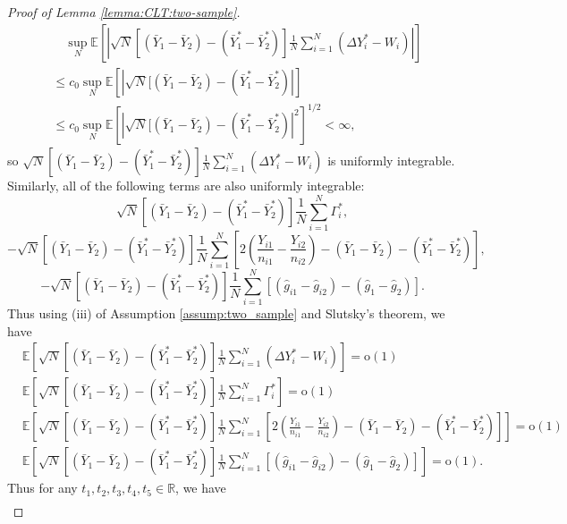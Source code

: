 \documentclass[12pt,letterpaper]{article}
\begin{document}
\begin{proof}[Proof of Lemma \ref{lemma:CLT:two-sample}]
$$\begin{array}{rl}
&\quad\displaystyle\sup_N\mathbb{E}\left[\left|\sqrt{N}[(\bar{Y}_1-\bar{Y}_2)-(\bar{Y}_1^*-\bar{Y}_2^*)]\frac{1}{N}\sum_{i=1}^N(\Delta Y_i^*-W_i)\right|\right]\\
&\displaystyle\leq c_0\sup_N\mathbb{E}\left[\left|\sqrt{N}[(\bar{Y}_1-\bar{Y}_2)-(\bar{Y}_1^*-\bar{Y}_2^*)\right|\right]\\
&\displaystyle\leq c_0\sup_N\mathbb{E}\left[\left|\sqrt{N}[(\bar{Y}_1-\bar{Y}_2)-(\bar{Y}_1^*-\bar{Y}_2^*)\right|^2\right]^{1/2}<\infty,
\end{array}$$
so $\displaystyle\sqrt{N}[(\bar{Y}_1-\bar{Y}_2)-(\bar{Y}_1^*-\bar{Y}_2^*)]\frac{1}{N}\sum_{i=1}^N(\Delta Y_i^*-W_i)$ is uniformly integrable. Similarly, all of the following terms are also uniformly integrable:
$$\sqrt{N}[(\bar{Y}_1-\bar{Y}_2)-(\bar{Y}_1^*-\bar{Y}_2^*)]\frac{1}{N}\sum_{i=1}^N\Gamma_i^*,$$
$$-\sqrt{N}[(\bar{Y}_1-\bar{Y}_2)-(\bar{Y}_1^*-\bar{Y}_2^*)]\frac{1}{N}\sum_{i=1}^N\left[2\left(\frac{Y_{i1}}{n_{i1}}-\frac{Y_{i2}}{n_{i2}}\right)-(\bar{Y}_1-\bar{Y}_2)-(\bar{Y}_1^*-\bar{Y}_2^*)\right],$$
$$-\sqrt{N}[(\bar{Y}_1-\bar{Y}_2)-(\bar{Y}_1^*-\bar{Y}_2^*)]\frac{1}{N}\sum_{i=1}^N[(\hat{g}_{i1}-\hat{g}_{i2})-(\hat{g}_1-\hat{g}_2)].$$
Thus using (iii) of Assumption \ref{assump:two_sample} and Slutsky's theorem, we have 
\begin{equation}\label{eq:vanish:mean:Y}
\begin{array}{rcl}
&\displaystyle\mathbb{E}\left[\sqrt{N}[(\bar{Y}_1-\bar{Y}_2)-(\bar{Y}_1^*-\bar{Y}_2^*)]\frac{1}{N}\sum_{i=1}^N(\Delta Y_i^*-W_i)\right]=\mathrm{o}(1)&\\
&\displaystyle\mathbb{E}\left[\sqrt{N}[(\bar{Y}_1-\bar{Y}_2)-(\bar{Y}_1^*-\bar{Y}_2^*)]\frac{1}{N}\sum_{i=1}^N\Gamma_i^*\right]=\mathrm{o}(1)&\\
&\displaystyle\mathbb{E}\left[\sqrt{N}[(\bar{Y}_1-\bar{Y}_2)-(\bar{Y}_1^*-\bar{Y}_2^*)]\frac{1}{N}\sum_{i=1}^N\!\!\left[2\left(\frac{Y_{i1}}{n_{i1}}-\frac{Y_{i2}}{n_{i2}}\right)\!-\!(\bar{Y}_1-\bar{Y}_2)\!-\!(\bar{Y}_1^*-\bar{Y}_2^*)\right]\right]=\mathrm{o}(1)&\\
&\displaystyle\mathbb{E}\left[\sqrt{N}[(\bar{Y}_1-\bar{Y}_2)-(\bar{Y}_1^*-\bar{Y}_2^*)]\frac{1}{N}\sum_{i=1}^N[(\hat{g}_{i1}-\hat{g}_{i2})-(\hat{g}_1-\hat{g}_2)]\right]=\mathrm{o}(1).&
\end{array}
\end{equation}
Thus for any $t_1,t_2,t_3,t_4,t_5\in\mathbb{R}$, we have 
\begin{equation}\label{eq:Y:delta:equiv}
\begin{array}{rl}

\end{array}
\end{equation}
\end{proof}
\end{document}
